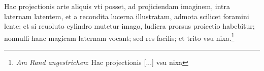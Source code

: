 \pend \pstart [p.~35] Hac projectionis arte aliquis vti posset,  ad projiciendam imaginem, intra laternam latentem, et a  recondita lucerna illustratam, admota scilicet foramini  lente; et si reuoluto cylindro mutetur imago, ludicra  prorsus proiectio habebitur; nonnulli hanc magicam laternam vocant; sed res facilis; et trito vsu nixa.\footnote{\textit{Am Rand angestrichen}: Hac projectionis [...] vsu nixa }